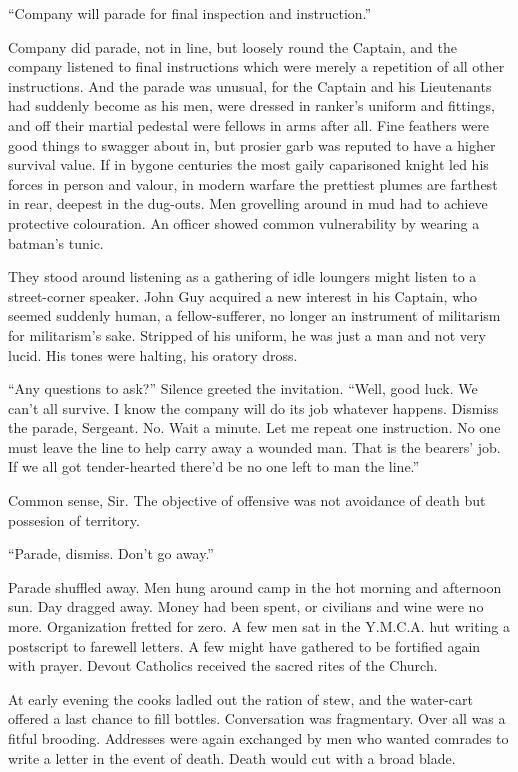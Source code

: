 ``Company will parade for final inspection and instruction.''

Company did parade, not in line, but loosely round the Captain, and the company listened to final instructions which were merely a repetition of all other instructions. And the parade was unusual, for the Captain and his Lieutenants had suddenly become as his men, were dressed in ranker's uniform and fittings, and off their martial pedestal were fellows in arms after all. Fine feathers were good things to swagger about in, but prosier garb was reputed to have a higher survival value. If in bygone centuries the most gaily caparisoned knight led his forces in person and valour, in modern warfare the prettiest plumes are farthest in rear, deepest in the dug-outs. Men grovelling around in mud had to achieve protective colouration. An officer showed common vulnerability by wearing a batman's tunic.

They stood around listening as a gathering of idle loungers might listen to a street-corner speaker. John Guy acquired a new interest in his Captain, who seemed suddenly human, a fellow-sufferer, no longer an instrument of militarism for militarism's sake. Stripped of his uniform, he was just a man and not very lucid. His tones were halting, his oratory dross.

``Any questions to ask?'' Silence greeted the invitation. ``Well, good luck. We can't all survive. I know the company will do its job whatever happens. Dismiss the parade, Sergeant. No. Wait a minute. Let me repeat one instruction. No one must leave the line to help carry away a wounded man. That is the bearers' job. If we all got tender-hearted there'd be no one left to man the line.''

Common sense, Sir. The objective of offensive was not avoidance of death but possesion of territory.

``Parade, dismiss. Don't go away.''

Parade shuffled away. Men hung around camp in the hot morning and afternoon sun. Day dragged away. Money had been spent, or civilians and wine were no more. Organization fretted for zero. A few men sat in the Y.M.C.A. hut writing a postscript to farewell letters. A few might have gathered to be fortified again with prayer. Devout Catholics received the sacred rites of the Church.

At early evening the cooks ladled out the ration of stew, and the water-cart offered a last chance to fill bottles. Conversation was fragmentary. Over all was a fitful brooding. Addresses were again exchanged by men who wanted comrades to write a letter in the event of death. Death would cut with a broad blade.


